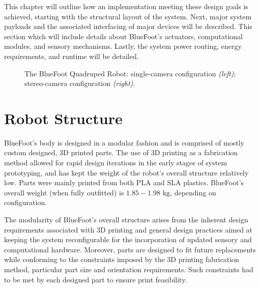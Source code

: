 

	This chapter will outline how an implementation meeting these design goals is achieved, starting with the structural layout of the system. Next, major system payloads and the associated interfacing of major devices will be described. This section which will include details about BlueFoot's actuators, computational modules, and sensory mechanisms. Lastly, the system power routing, energy requirements, and runtime will be detailed.

		\begin{figure}[h!]
			\centering
			\caption{The BlueFoot Quadruped Robot: single-camera configuration \emph{(left)}; stereo-camera configuration \emph{(right)}.}
			\label{fig::bluefoot}
		\end{figure} 
	
	\section{Robot Structure}
	
		BlueFoot's body is designed in a modular fashion and is comprised of mostly custom designed, 3D printed parts. The use of 3D printing as a fabrication method allowed for rapid design iterations in the early stages of system prototyping, and has kept the weight of the robot's overall structure relatively low. Parts were mainly printed from both PLA and SLA plastics. BlueFoot's overall weight (when fully outfitted) is $1.85-1.98 \text{ kg}$, depending on configuration.

		The modularity of BlueFoot's overall structure arises from the inherent design requirements associated with 3D printing and general design practices aimed at keeping the system reconfigurable for the incorporation of updated sensory and computational hardware. Moreover, parts are designed to fit future replacements while conforming to the constraints imposed by the 3D printing fabrication method, \IE particular part size and orientation requirements. Such constraints had to be met by each designed part to ensure print feasibility. 

